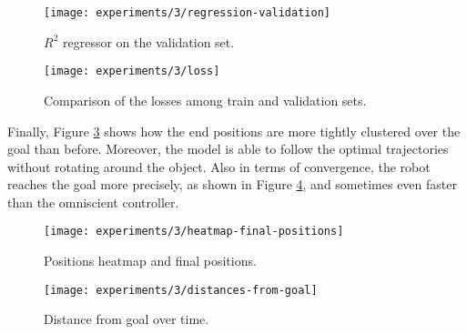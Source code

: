 \begin{figure}[htbp]
	\centerline{\texttt{[image: experiments/3/regression-validation]}}
	\caption{$R^2$ regressor on the validation set.}
	\label{fig:regression-3}
\end{figure}

\begin{figure}[htbp]
	
	\centerline{\texttt{[image: experiments/3/loss]}}
	\caption{Comparison of the losses among train and validation sets.}
	\label{fig:loss-3}
\end{figure}

Finally, Figure \ref{fig:heatmap-final-positions} shows how the end positions 
are more tightly clustered over the goal than before. Moreover, the model is 
able to follow the optimal trajectories without rotating around the object.
Also in terms of convergence, the robot reaches the goal more precisely, as 
shown in Figure \ref{fig:distance-from-goal-learned3}, and sometimes even 
faster than the omniscient controller.

\begin{figure}[htbp]
	\centerline{\texttt{[image: experiments/3/heatmap-final-positions]}}
	\caption{Positions heatmap and final positions.}
	\label{fig:heatmap-final-positions}
\end{figure}

\begin{figure}[htbp]
	\centerline{\texttt{[image: experiments/3/distances-from-goal]}}
	\caption{Distance from goal over time.}
	\label{fig:distance-from-goal-learned3}
\end{figure}